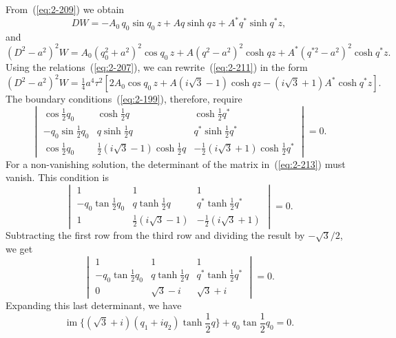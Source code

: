 From~(\ref{eq:2-209}) we obtain
\begin{equation}
\label{eq:2-210}
DW = -A_0\,q_0\sin q_0\,z + Aq\sinh qz + A^*q^*\sinh q^*z,
\end{equation}
and
\begin{equation}
\label{eq:2-211}
(D^2-a^2)^2W = A_0(q_0^2+a^2)^2\cos q_0\,z + A(q^2-a^2)^2\cosh qz + A^*(q^{*2}-a^2)^2\cosh q^*z.
\end{equation}
Using the relations~(\ref{eq:2-207}), we can rewrite~(\ref{eq:2-211}) in the form
\begin{equation}
\label{eq:2-212}
(D^2-a^2)^2W = \tfrac{1}{4}a^4\tau^2[2A_0\cos q_0\,z + A(i\sqrt{3}-1)\cosh qz - (i\sqrt{3}+1)A^*\cosh q^*z].
\end{equation}
The boundary conditions~(\ref{eq:2-199}), therefore, require
\begin{equation}
\label{eq:2-213}
\begin{vmatrix}
\cos\frac{1}{2}q_0 & \cosh\frac{1}{2}q & \cosh\frac{1}{2}q^* \\
-q_0\sin\frac{1}{2}q_0 & q\sinh\frac{1}{2}q & q^*\sinh\frac{1}{2}q^* \\
\cos\frac{1}{2}q_0 & \frac{1}{2}(i\sqrt{3}-1)\cosh\frac{1}{2}q & -\frac{1}{2}(i\sqrt{3}+1)\cosh\frac{1}{2}q^*
\end{vmatrix} = 0.
\end{equation}
For a non-vanishing solution, the determinant of the matrix in~(\ref{eq:2-213}) must vanish. This condition is
\begin{equation}
\label{eq:2-214}
\begin{vmatrix}
1 & 1 & 1 \\
-q_0\tan\frac{1}{2}q_0 & q\tanh\frac{1}{2}q & q^*\tanh\frac{1}{2}q^* \\
1 & \frac{1}{2}(i\sqrt{3}-1) & -\frac{1}{2}(i\sqrt{3}+1)
\end{vmatrix} = 0.
\end{equation}
Subtracting the first row from the third row and dividing the result by
$-\sqrt{3}/2$, we get
\begin{equation}
\label{eq:2-215}
\begin{vmatrix}
1 & 1 & 1 \\
-q_0\tan\frac{1}{2}q_0 & q\tanh\frac{1}{2}q & q^*\tanh\frac{1}{2}q^* \\
0 & \sqrt{3}-i & \sqrt{3}+i
\end{vmatrix} = 0.
\end{equation}
Expanding this last determinant, we have
\begin{equation}
\label{eq:2-216}
\operatorname{im}\{(\sqrt{3}+i)(q_1+iq_2)\tanh\frac{1}{2}q\} + q_0\tan\frac{1}{2}q_0 = 0.
\end{equation}

